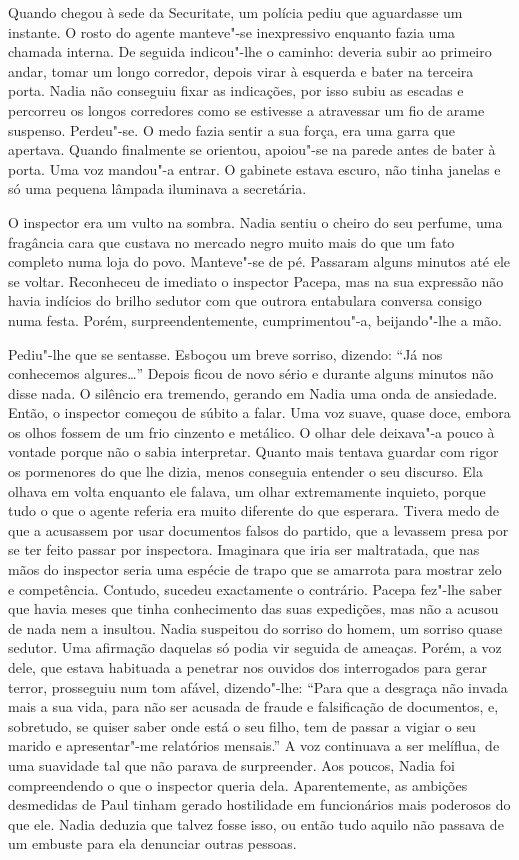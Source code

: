 Quando chegou à sede da Securitate, um polícia pediu
que aguardasse um instante. O rosto do agente manteve"-se inexpressivo
enquanto fazia uma chamada interna. De seguida indicou"-lhe o caminho:
deveria subir ao primeiro andar, tomar um longo corredor, depois virar à
esquerda e bater na terceira porta. Nadia não conseguiu fixar as indicações, por isso subiu as escadas e percorreu os longos corredores como
se estivesse a atravessar um fio de arame suspenso. Perdeu"-se. O medo
fazia sentir a sua força, era uma garra que apertava. Quando finalmente
se orientou, apoiou"-se na parede antes de bater à porta. Uma voz
mandou"-a entrar. O gabinete estava escuro, não tinha janelas e só uma
pequena lâmpada iluminava a secretária.

O inspector era um vulto na sombra. Nadia sentiu o cheiro do seu
perfume, uma fragância cara que custava no mercado negro muito mais do
que um fato completo numa loja do povo. Manteve"-se de pé. Passaram
alguns minutos até ele se voltar. Reconheceu de imediato o inspector
Pacepa, mas na sua expressão não havia indícios do brilho sedutor com
que outrora entabulara conversa consigo numa festa. Porém,
surpreendentemente, cumprimentou"-a, beijando"-lhe a mão.

Pediu"-lhe que se sentasse. Esboçou um breve sorriso, dizendo: ``Já nos
conhecemos algures\ldots{}'' Depois ficou de novo sério e durante alguns
minutos não disse nada. O silêncio era tremendo, gerando em Nadia uma
onda de ansiedade. Então, o inspector começou de súbito a falar. Uma voz
suave, quase doce, embora os olhos fossem de um frio cinzento e
metálico. O olhar dele deixava"-a pouco à vontade porque não o sabia
interpretar. Quanto mais tentava guardar com rigor os pormenores do
que lhe dizia, menos conseguia entender o seu discurso. Ela olhava em
volta enquanto ele falava, um olhar extremamente inquieto, porque tudo o
que o agente referia era muito diferente do que esperara. Tivera medo de
que a acusassem por usar documentos falsos do partido, que a levassem
presa por se ter feito passar por inspectora. Imaginara que iria ser
maltratada, que nas mãos do inspector seria uma espécie de trapo que se
amarrota para mostrar zelo e competência. Contudo, sucedeu exactamente
o contrário. Pacepa fez"-lhe saber que havia meses que tinha conhecimento das suas expedições, mas não a acusou de nada nem a insultou.
Nadia suspeitou do sorriso do homem, um sorriso quase sedutor. Uma
afirmação daquelas só podia vir seguida de ameaças. Porém, a voz dele,
que estava habituada a penetrar nos ouvidos dos interrogados para
gerar terror, prosseguiu num tom afável, dizendo"-lhe: ``Para que a
desgraça não invada mais a sua vida, para não ser acusada de fraude e
falsificação de documentos, e, sobretudo, se quiser saber onde está o
seu filho, tem de passar a vigiar o seu marido e apresentar"-me
relatórios mensais.'' A voz continuava a ser melíflua, de uma suavidade
tal que não parava de surpreender. Aos poucos, Nadia foi compreendendo
o que o inspector queria dela. Aparentemente, as ambições desmedidas de
Paul tinham gerado hostilidade em funcionários mais poderosos do que
ele. Nadia deduzia que talvez fosse isso, ou então tudo aquilo não
passava de um embuste para ela denunciar outras pessoas.


